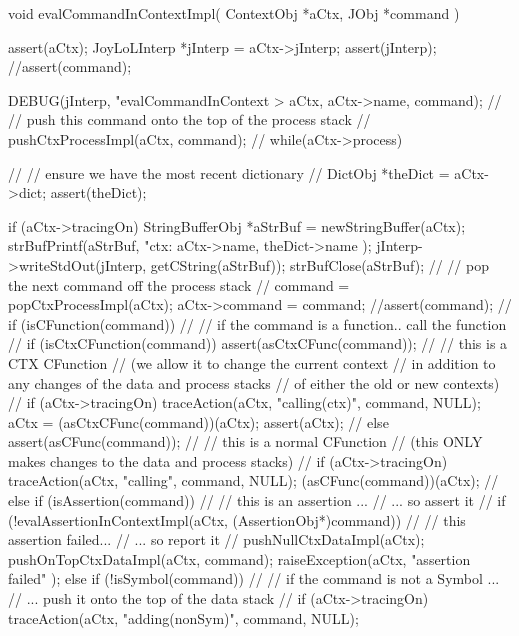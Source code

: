 \startCCode
void evalCommandInContextImpl(
  ContextObj *aCtx,
  JObj       *command
) {
  assert(aCtx);
  JoyLoLInterp *jInterp = aCtx->jInterp;
  assert(jInterp);
  //assert(command);
  
  DEBUG(jInterp, "evalCommandInContext > %
    aCtx, aCtx->name, command);
  //
  // push this command onto the top of the process stack
  //
  pushCtxProcessImpl(aCtx, command);
  //
  while(aCtx->process) {
    //
    // ensure we have the most recent dictionary
    //
    DictObj *theDict = aCtx->dict;
    assert(theDict);
    
    if (aCtx->tracingOn) {
      StringBufferObj *aStrBuf = newStringBuffer(aCtx);
      strBufPrintf(aStrBuf,
        "\n ctx: %
        aCtx->name, theDict->name
      );
      jInterp->writeStdOut(jInterp, getCString(aStrBuf));
      strBufClose(aStrBuf);
    }
    //
    // pop the next command off the process stack
    //
    command = popCtxProcessImpl(aCtx);
    aCtx->command = command;
    //assert(command);
    //
    if (isCFunction(command)) {
      //
      // if the command is a function.. call the function
      //
      if (isCtxCFunction(command)) {
        assert(asCtxCFunc(command));
        //
        // this is a CTX CFunction
        // (we allow it to change the current context
        //  in addition to any changes of the data and process stacks
        //  of either the old or new contexts)
        //
        if (aCtx->tracingOn) 
          traceAction(aCtx, "calling(ctx)", command, NULL);
        aCtx = (asCtxCFunc(command))(aCtx);
        assert(aCtx);
        //
      } else {
        assert(asCFunc(command));
        //
        // this is a normal CFunction
        // (this ONLY makes changes to the data and process stacks)
        //
        if (aCtx->tracingOn) 
          traceAction(aCtx, "calling", command, NULL);
        (asCFunc(command))(aCtx);
        //
      }
    } else if (isAssertion(command)) {
      //
      // this is an assertion ...
      //   ... so assert it 
      //
      if (!evalAssertionInContextImpl(aCtx, (AssertionObj*)command)) {
        //
        // this assertion failed... 
        //   ... so report it
        //
        pushNullCtxDataImpl(aCtx);
        pushOnTopCtxDataImpl(aCtx, command);
        raiseException(aCtx,
          "assertion failed"
        );
      }
    } else if (!isSymbol(command)) {
      //
      // if the command is not a Symbol ...
      //  ...  push it onto the top of the data stack
      //
      if (aCtx->tracingOn)
        traceAction(aCtx, "adding(nonSym)", command, NULL);
}}}
